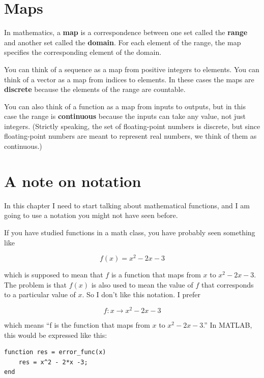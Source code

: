 \documentclass{book}
\begin{document}
\section{Maps}
\label{map}

In mathematics, a {\bf map} is a correspondence between one
set called the {\bf range} and another set called the
{\bf domain}.  For each element of the range, the map specifies
the corresponding element of the domain.

You can think of a sequence as a map from positive integers
to elements.  You can think of a vector
as a map from indices to elements.  In these cases the maps
are {\bf discrete} because the elements of the range are countable.

You can also think of a function as a map from inputs to outputs, but
in this case the range is {\bf continuous} because the inputs can take
any value, not just integers.  (Strictly speaking, the set of
floating-point numbers is discrete, but since floating-point numbers
are meant to represent real numbers, we think of them as continuous.)


\section{A note on notation}
\label{notation}

In this chapter I need to start talking about mathematical
functions, and I am going to use a notation you might not have
seen before.

If you have studied functions in a math class, you have probably
seen something like

\begin{equation}
f(x) = x^2 - 2x -3
\end{equation}

which is supposed to mean that $f$ is a function that maps from
$x$ to $x^2 - 2x -3$.  The problem is that $f(x)$ is also used to mean
the value of $f$ that corresponds to a particular value of $x$.  So I
don't like this notation.  I prefer

\begin{equation}
f : x \to x^2 - 2x -3
\end{equation}

which means ``f is the function that maps from
$x$ to $x^2 - 2x -3$.''  In MATLAB, this would be expressed
like this:

\begin{verbatim}
function res = error_func(x)
    res = x^2 - 2*x -3;
end
\end{verbatim}
\end{document}
